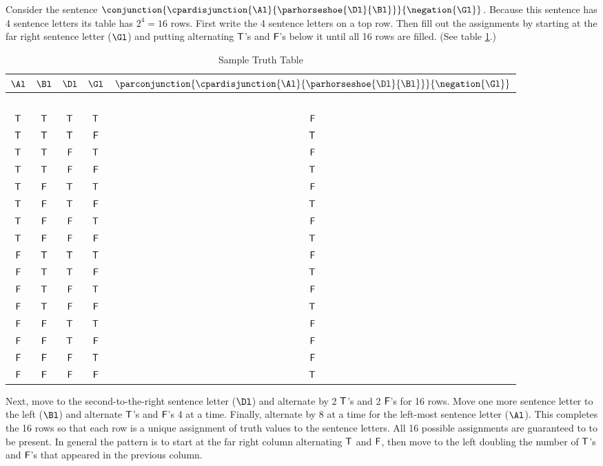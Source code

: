 Consider the sentence $\conjunction{\cpardisjunction{\Al}{\parhorseshoe{\Dl}{\Bl}}}{\negation{\Gl}}$.
Because this sentence has 4 sentence letters its table has $2^4=16$ rows. 
First write the 4 sentence letters on a top row.
Then fill out the assignments by starting at the far right sentence letter ($\Gl$) and putting alternating $\mathsf{T}$'s and $\mathsf{F}$'s below it until all 16 rows are filled. (See table \ref{truthtableexample}.) 
\begin{table}[!ht]
\begin{center}
\begin{tabular}{ c c c c c}
$\Al$ & $\Bl$ & $\Dl$ & $\Gl$ & $\parconjunction{\cpardisjunction{\Al}{\parhorseshoe{\Dl}{\Bl}}}{\negation{\Gl}}$ \\
\hline
$ $ & $ $ & & & \\[-.25cm]
$\mathsf{T}$ & $\mathsf{T}$ & $\mathsf{T}$ & $\mathsf{T}$ & $\mathsf{F}$ \\
$\mathsf{T}$ & $\mathsf{T}$ & $\mathsf{T}$ & $\mathsf{F}$& $\mathsf{T}$ \\
$\mathsf{T}$ & $\mathsf{T}$ & $\mathsf{F}$ & $\mathsf{T}$ & $\mathsf{F}$ \\
$\mathsf{T}$ & $\mathsf{T}$ & $\mathsf{F}$ & $\mathsf{F}$  & $\mathsf{T}$ \\
$\mathsf{T}$ &  $\mathsf{F}$& $\mathsf{T}$ & $\mathsf{T}$	&$\mathsf{F}$ \\
$\mathsf{T}$ & $\mathsf{F}$ & $\mathsf{T}$ & $\mathsf{F}$	& $\mathsf{T}$  \\
$\mathsf{T}$ &$\mathsf{F}$  & $\mathsf{F}$& $\mathsf{T}$	&$\mathsf{F}$ \\
$\mathsf{T}$ & $\mathsf{F}$ &$\mathsf{F}$	& $\mathsf{F}$	& $\mathsf{T}$ \\
$\mathsf{F}$	& $\mathsf{T}$ & $\mathsf{T}$ & $\mathsf{T}$	& $\mathsf{F}$ \\
$\mathsf{F}$	& $\mathsf{T}$ & $\mathsf{T}$ & $\mathsf{F}$	& $\mathsf{T}$ \\
$\mathsf{F}$	& $\mathsf{T}$ & $\mathsf{F}$&	$\mathsf{T}$ &$\mathsf{F}$ \\
$\mathsf{F}$	& $\mathsf{T}$ & $\mathsf{F}$& $\mathsf{F}$	& $\mathsf{T}$ \\
$\mathsf{F}$	& $\mathsf{F}$	& $\mathsf{T}$ & $\mathsf{T}$	&$\mathsf{F}$ \\
$\mathsf{F}$	& $\mathsf{F}$	& $\mathsf{T}$ & $\mathsf{F}$	& $\mathsf{F}$ \\
$\mathsf{F}$	& $\mathsf{F}$	& $\mathsf{F}$& $\mathsf{T}$	& $\mathsf{F}$ \\
$\mathsf{F}$	& $\mathsf{F}$& $\mathsf{F}$& $\mathsf{F}$	& $\mathsf{T}$ \\
\end{tabular}
\end{center}
\caption{Sample Truth Table}
\label{truthtableexample}
\end{table}
Next, move to the second-to-the-right sentence letter ($\Dl$) and alternate by 2 $\mathsf{T}$'s and 2 $\mathsf{F}$'s for 16 rows. 
Move one more sentence letter to the left ($\Bl$) and alternate $\mathsf{T}$'s and $\mathsf{F}$'s 4 at a time. 
Finally, alternate by 8 at a time for the left-most sentence letter ($\Al$).
This completes the 16 rows so that each row is a unique assignment of truth values to the sentence letters.
All 16 possible assignments are guaranteed to to be present.
In general the pattern is to start at the far right column alternating $\mathsf{T}$ and $\mathsf{F}$, then move to the left doubling the number of $\mathsf{T}$'s and $\mathsf{F}$'s that appeared in the previous column. 

